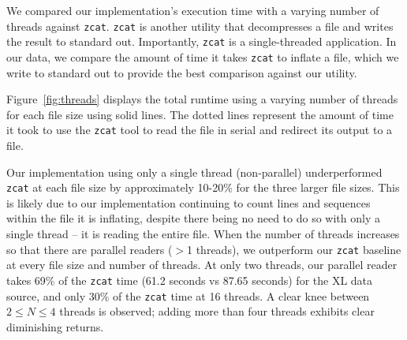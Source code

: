 We compared our \ireader implementation's execution time with a varying number
of threads against \texttt{zcat}. \texttt{zcat} is another \zlib utility that
decompresses a \gzip file and writes the result to standard out. Importantly,
\texttt{zcat} is a single-threaded application. In our data, we compare the
amount of time it takes \texttt{zcat} to inflate a file, which we write to
standard out to provide the best comparison against our \ireader utility.

Figure~\ref{fig:threads} displays the total \ireader runtime using a varying
number of threads for each file size using solid lines. The dotted lines
represent the amount of time it took to use the \texttt{zcat} tool to read the
file in serial and redirect its output to a file.

Our \ireader implementation using only a single thread (non-parallel) underperformed
\texttt{zcat} at each file size by approximately 10-20\% for the three larger
file sizes. This is likely due to our implementation continuing to count lines
and sequences within the \gzip file it is inflating, despite there being no need
to do so with only a single thread -- it is reading the entire file. When the
number of threads increases so that there are parallel readers ($>$1 threads),
we outperform our \texttt{zcat} baseline at every file size and number of
threads. At only two threads, our parallel reader takes 69\% of the
\texttt{zcat} time (61.2 seconds vs 87.65 seconds) for the XL data source, and
only 30\% of the \texttt{zcat} time at 16 threads. A clear knee between $2 \leq
N \leq 4$ threads is observed; adding more than four threads exhibits clear
diminishing returns. 
